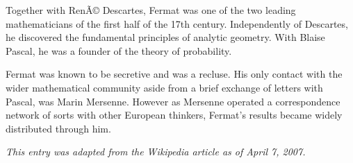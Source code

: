 \documentclass[12pt]{article}
\begin{document}
Together with RenÃ© Descartes, Fermat was one of the two leading mathematicians of the first half of the 17th century. Independently of Descartes, he discovered the fundamental principles of analytic geometry. With Blaise Pascal, he was a founder of the theory of probability.

Fermat was known to be secretive and was a recluse. His only contact with the wider mathematical community aside from a brief exchange of letters with Pascal, was Marin Mersenne. However as Mersenne operated a correspondence network of sorts with other European thinkers, Fermat's results became widely distributed through him.

{\it This entry was adapted from the Wikipedia article  as of April 7, 2007.}
\end{document}
